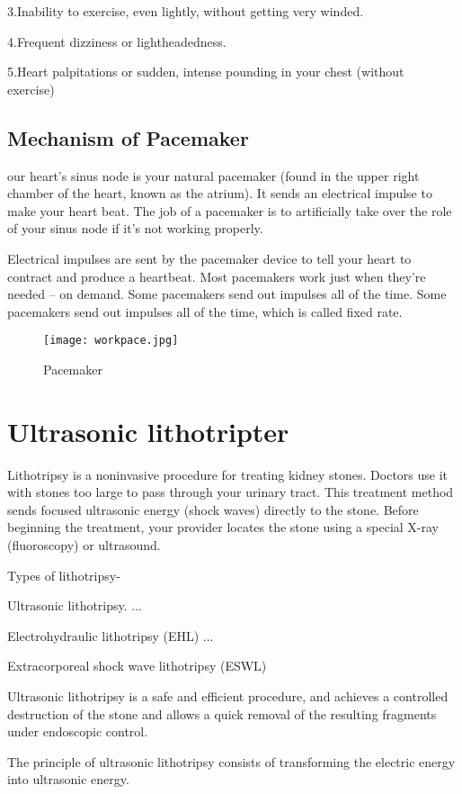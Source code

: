 \documentclass[12pt]{report}
\begin{document}
3.Inability to exercise, even lightly, without getting very winded.\

4.Frequent dizziness or lightheadedness.\

5.Heart palpitations or sudden, intense pounding in your chest (without exercise)\

\subsection{Mechanism of Pacemaker}
our heart’s sinus node is your natural pacemaker (found in the upper right chamber of the heart, known as the atrium). It sends an electrical impulse to make your heart beat. The job of a pacemaker is to artificially take over the role of your sinus node if it's not working properly.

Electrical impulses are sent by the pacemaker device to tell your heart to contract and produce a heartbeat. Most pacemakers work just when they’re needed – on demand. Some pacemakers send out impulses all of the time. Some pacemakers send out impulses all of the time, which is called fixed rate.
\begin{figure}[h]
\centering
\texttt{[image: workpace.jpg]}
\caption{Pacemaker}
\end{figure}
\clearpage

\section{Ultrasonic lithotripter}
Lithotripsy is a noninvasive procedure for treating kidney stones. Doctors use it with stones too large to pass through your urinary tract. This treatment method sends focused ultrasonic energy (shock waves) directly to the stone. Before beginning the treatment, your provider locates the stone using a special X-ray (fluoroscopy) or ultrasound.\

Types of lithotripsy-\

Ultrasonic lithotripsy. ...\

Electrohydraulic lithotripsy (EHL) ...\

Extracorporeal shock wave lithotripsy (ESWL)\


Ultrasonic lithotripsy is a safe and efficient procedure, and achieves a controlled destruction of the stone and allows a quick removal of the resulting fragments under endoscopic control.\

The principle of ultrasonic lithotripsy consists of transforming the electric energy into ultrasonic energy.\
\end{document}
